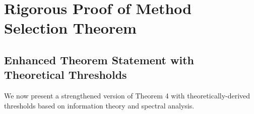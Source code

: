 \section{Rigorous Proof of Method Selection Theorem}
\label{sec:theorem4_rigorous}


\subsection{Enhanced Theorem Statement with Theoretical Thresholds}

We now present a strengthened version of Theorem 4 with theoretically-derived thresholds based on information theory and spectral analysis.

